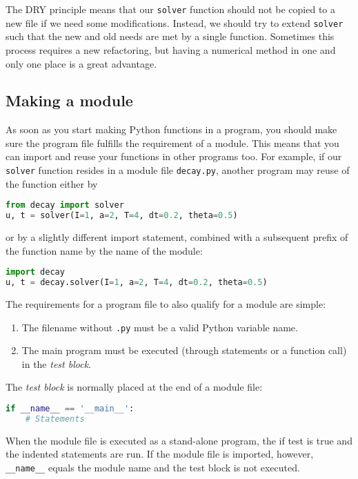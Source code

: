 \documentclass[graybox,sectrefs,envcountresetchap,open=right,final]{svmonodo}
\begin{document}
The DRY principle means that our \texttt{solver} function should not be
copied to a new file if we need some modifications. Instead, we
should try to extend \texttt{solver} such that the new and old needs are
met by a single function. Sometimes this process requires a new
refactoring, but having a numerical method in one and only one place
is a great advantage.

\subsection{Making a module}
\label{softeng1:basic:module}

As soon as you start making Python functions in a program, you should
make sure the program file fulfills the requirement of a module.
This means that you can import and reuse your functions in other
programs too. For example, if our \texttt{solver} function resides in a
module file \texttt{decay.py}, another program may reuse of the
function either by

\begin{lstlisting}[language=Python,style=blue1_bluegreen]
from decay import solver
u, t = solver(I=1, a=2, T=4, dt=0.2, theta=0.5)
\end{lstlisting}
or by a slightly different import statement, combined with a subsequent
prefix of the function name by the name of the module:

\begin{lstlisting}[language=Python,style=blue1_bluegreen]
import decay
u, t = decay.solver(I=1, a=2, T=4, dt=0.2, theta=0.5)
\end{lstlisting}

The requirements for a program file to also qualify for a module are simple:

\begin{enumerate}
\item The filename without \texttt{.py} must be a valid Python variable name.

\item The main program must be executed (through statements or
   a function call) in the \emph{test block}.
\end{enumerate}

\noindent
The \emph{test block} is normally placed at the end of a module file:

\begin{lstlisting}[language=Python,style=blue1_bluegreen]
if __name__ == '__main__':
    # Statements
\end{lstlisting}
When the module file is executed as a stand-alone program, the if test
is true and the indented statements are run. If the module file
is imported, however, \Verb!__name__! equals the module name and the test block
is not executed.
\end{document}
